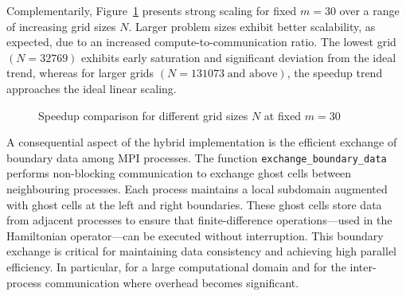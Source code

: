 \documentclass[12pt,a4paper]{report}
\begin{document}
Complementarily, Figure~\ref{fig:stromboli_common_m_diff_n} presents strong scaling for fixed $m=30$ over a range of increasing grid sizes $N$. Larger problem sizes exhibit better scalability, as expected, due to an increased compute-to-communication ratio. The lowest grid $(N=32769)$ exhibits early saturation and significant deviation from the ideal trend, whereas for larger grids $(N=131073 \; \text{and above})$, the speedup trend approaches the ideal linear scaling.
\begin{figure}[htbp]
\centering
{}
\caption{Speedup comparison for different grid sizes $N$ at fixed $m=30$}
\label{fig:stromboli_common_m_diff_n}
\end{figure}

A consequential aspect of the hybrid implementation is the efficient exchange of boundary data among MPI processes. The function \texttt{exchange\_boundary\_data} performs non-blocking communication to exchange ghost cells between neighbouring processes. Each process maintains a local subdomain augmented with ghost cells at the left and right boundaries. These ghost cells store data from adjacent processes to ensure that finite-difference operations—used in the Hamiltonian operator—can be executed without interruption. This boundary exchange is critical for maintaining data consistency and achieving high parallel efficiency. In particular, for a large computational domain and for the inter-process communication where overhead becomes significant.
\end{document}
